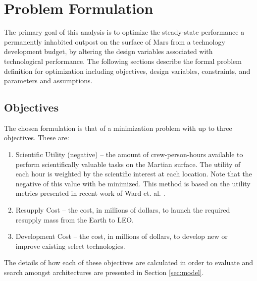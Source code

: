 \documentclass[]{aiaa-pretty}
\begin{document}
\section{Problem Formulation}  
\label{sec:formulation}
The primary goal of this analysis is to optimize the steady-state performance a permanently inhabited outpost on the surface of Mars from a technology development budget, by altering the design variables associated with technological performance. The following sections describe the formal problem definition for optimization including objectives, design variables, constraints, and parameters and assumptions.

\subsection{Objectives}
The chosen formulation is that of a minimization problem with up to three objectives. These are: 
\begin{enumerate}
\item Scientific Utility (negative) – the amount of crew-person-hours available to perform scientifically valuable tasks on the Martian surface. The utility of each hour is weighted by the scientific interest at each location. Note that the negative of this value with be minimized. This method is based on the utility metrics presented in recent work of Ward et. al. \cite{ward2015}.
\item Resupply Cost – the cost, in millions of dollars, to launch the required resupply mass from the Earth to LEO.
\item Development Cost – the cost, in millions of dollars, to develop new or improve existing select technologies.
\end{enumerate}
The details of how each of these objectives are calculated in order to evaluate and search amongst architectures are presented in Section \ref{sec:model}. 
\end{document}
